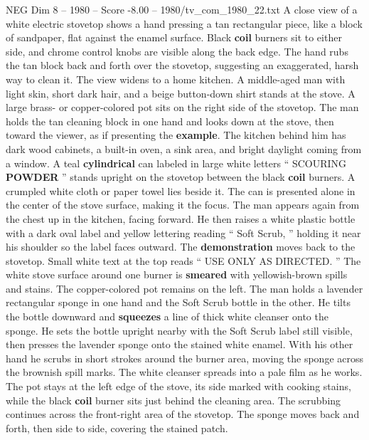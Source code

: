 \begin{textsample}{NEG Dim 8 – 1980 – Score -8.00 – 1980/tv\_com\_1980\_22.txt}  \label{ex:f8_neg_051}
A close view of a white electric stovetop shows a hand pressing a tan rectangular piece, like a block of sandpaper, flat against the enamel surface.
Black \textbf{coil} burners sit to either side, and chrome control knobs are visible along the back edge.
The hand rubs the tan block back and forth over the stovetop, suggesting an exaggerated, harsh way to clean it.
The view widens to a home kitchen.
A middle-aged man with light skin, short dark hair, and a beige button-down shirt stands at the stove.
A large brass- or copper-colored pot sits on the right side of the stovetop.
The man holds the tan cleaning block in one hand and looks down at the stove, then toward the viewer, as if presenting the \textbf{example}.
The kitchen behind him has dark wood cabinets, a built-in oven, a sink area, and bright daylight coming from a window.
A teal \textbf{cylindrical} can labeled in large white letters “ SCOURING \textbf{POWDER} ” stands upright on the stovetop between the black \textbf{coil} burners.
A crumpled white cloth or paper towel lies beside it.
The can is presented alone in the center of the stove surface, making it the focus.
The man appears again from the chest up in the kitchen, facing forward.
He then raises a white plastic bottle with a dark oval label and yellow lettering reading “ Soft Scrub, ” holding it near his shoulder so the label faces outward.
The \textbf{demonstration} moves back to the stovetop.
Small white text at the top reads “ USE ONLY AS DIRECTED. ” The white stove surface around one burner is \textbf{smeared} with yellowish-brown spills and stains.
The copper-colored pot remains on the left.
The man holds a lavender rectangular sponge in one hand and the Soft Scrub bottle in the other.
He tilts the bottle downward and \textbf{squeezes} a line of thick white cleanser onto the sponge.
He sets the bottle upright nearby with the Soft Scrub label still visible, then presses the lavender sponge onto the stained white enamel.
With his other hand he scrubs in short strokes around the burner area, moving the sponge across the brownish spill marks.
The white cleanser spreads into a pale film as he works.
The pot stays at the left edge of the stove, its side marked with cooking stains, while the black \textbf{coil} burner sits just behind the cleaning area.
The scrubbing continues across the front-right area of the stovetop.
The sponge moves back and forth, then side to side, covering the stained patch.

\end{textsample}
